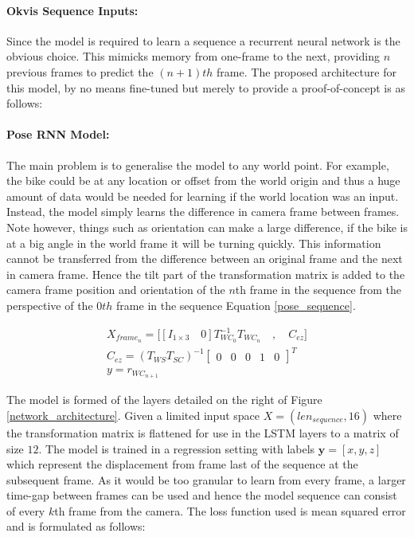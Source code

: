 \documentclass[11pt,twoside]{report}
\begin{document}
\paragraph{Okvis Sequence Inputs:}
Since the model is required to learn a sequence a recurrent neural network is the obvious choice. This mimicks memory from one-frame to the next, providing $n$ previous frames to predict the $(n+1)th$ frame. The proposed architecture for this model, by no means fine-tuned but merely to provide a proof-of-concept is as follows:

\paragraph{Pose RNN Model:} \label{pose_model}
The main problem is to generalise the model to any world point. For example, the bike could be at any location or offset from the world origin and thus a huge amount of data would be needed for learning if the world location was an input. Instead, the model simply learns the difference in camera frame between frames. Note however, things such as orientation can make a large difference, if the bike is at a big angle in the world frame it will be turning quickly. This information cannot be transferred from the difference between an original frame and the next in camera frame. Hence the tilt part of the transformation matrix is added to the camera frame position and orientation of the $n$th frame in the sequence from the perspective of the $0th$ frame in the sequence Equation \ref{pose_sequence}.


\begin{equation}
\begin{aligned}
X_{frame_{n}} = 
\bigg [ [I_{1 \times 3} \quad 0]T^{-1}_{WC_{0}}T_{WC_{n}} \quad , \quad C_{ez}\bigg ]\\
C_{ez} = (T_{WS} T_{SC})^{-1}
\begin{bmatrix}
0 & 0 & 0 & 1 & 0
\end{bmatrix}^{T}\\
y = r_{WC_{n+1}}
\end{aligned}
\label{pose_sequence}
\end{equation}

The model is formed of the layers detailed on the right of Figure \ref{network_architecture}. Given a limited input space $X = (len_{sequence}, 16)$ where the transformation matrix is flattened for use in the LSTM layers to a matrix of size $12$. The model is trained in a regression setting with labels $\mathbf{y}=[x,y,z]$ which represent the displacement from frame last of the sequence at the subsequent frame. As it would be too granular to learn from every frame, a larger time-gap between frames can be used and hence the model sequence can consist of every $k$th frame from the camera. The loss function used is mean squared error and is formulated as follows:
\end{document}

